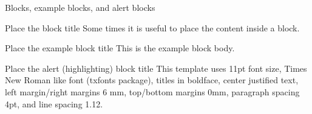 \documentclass{beamer}
\begin{document}
\begin{frame}{Blocks, example blocks, and alert blocks}
\scriptsize	
	\begin{block}{Place the block title}
		Some times it is useful to place the content inside a block.
	\end{block}
    
    \begin{exampleblock}{Place the example block title}
    	This is the example block body.
    \end{exampleblock}
    
    \begin{alertblock}{Place the alert (highlighting) block title}
    	This template uses 11pt font size, Times New Roman like font (txfonts package), titles in boldface, center justified text, left margin/right margins 6 mm, top/bottom margins 0mm, paragraph spacing 4pt, and line spacing 1.12.  
    \end{alertblock}
\end{frame}
\end{document}
